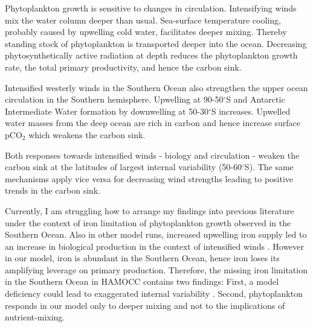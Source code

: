 \documentclass[12pt]{article}
\begin{document}
Phytoplankton growth is sensitive to changes in circulation. Intensifying winds mix the water column deeper than usual. Sea-surface temperature cooling, probably caused by upwelling cold water, facilitates deeper mixing. Thereby standing stock of phytoplankton is transported deeper into the ocean. Decreasing phytosynthetically active radiation at depth reduces the phytoplankton growth rate, the total primary productivity, and hence the carbon sink. 

Intensified westerly winds in the Southern Ocean also strengthen the upper ocean circulation in the Southern hemisphere. Upwelling at 90-50$^\circ$S and Antarctic Intermediate Water formation by downwelling at 50-30$^\circ$S increases. Upwelled water masses from the deep ocean are rich in carbon and hence increase surface pCO$_2$ which weakens the carbon sink. 

Both responses towards intensified winds - biology and circulation - weaken the carbon sink at the latitudes of largest internal variability (50-60$^\circ$S).  
The same mechanisms apply vice versa for decreasing wind strengths leading to positive trends in the carbon sink. 

Currently, I am struggling how to arrange my findings into previous literature under the context of iron limitation of phytoplankton growth observed in the Southern Ocean. Also in other model runs, increased upwelling iron supply led to an increase in biological production in the context of intensified winds \citep{Lovenduski2005,Hauck2013,wang2012}. However in our model, iron is abundant in the Southern Ocean, hence iron loses its amplifying leverage on primary production. Therefore, the missing iron limitation in the Southern Ocean in HAMOCC contains two findings: First, a model deficiency could lead to exaggerated internal variability \citep{Nevison2016}. Second, phytoplankton responds in our model only to deeper mixing and not to the implications of nutrient-mixing. 

\vspace{1cm}

\baselineskip12pt


\end{document}
